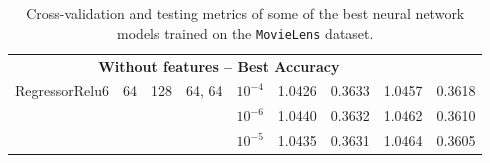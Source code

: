 \begin{table}
\begin{tabular}{lcclccccc}
\midrule
\multicolumn{8}{c}{\textbf{Without features -- Best Accuracy}}\\\addlinespace
RegressorRelu6 & 64 & 128 & 64, 64 & $10^{-4}$ &  1.0426 &      0.3633 &   1.0457 &        0.3618 \\
 &    &     &     & $10^{-6}$ &  1.0440 &      0.3632 &   1.0462 &        0.3610 \\
  &    &     &   & $10^{-5}$ &  1.0435 &      0.3631 &   1.0464 &        0.3605 \\
           
           

\bottomrule
\end{tabular}
\caption{Cross-validation and testing metrics of some of the best neural network models trained on the \texttt{MovieLens} dataset. }
\label{tab:results.nn}
\end{table}
